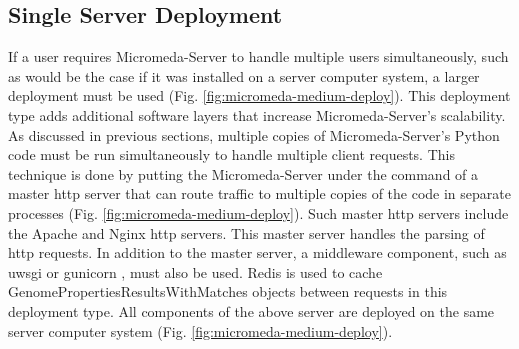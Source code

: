 \subsection{Single Server Deployment} \label{single-server-micromeda-deployment}

If a user requires Micromeda-Server to handle multiple users simultaneously, 
such as would be the case if it was installed on a server computer system, a 
larger deployment must be used (Fig. \ref{fig:micromeda-medium-deploy}). This 
deployment type adds additional software layers that increase Micromeda-Server's 
scalability. As discussed in previous sections, multiple copies of 
Micromeda-Server's Python code must be run simultaneously to handle multiple 
client requests. This technique is done by putting the Micromeda-Server under 
the command of a master \gls{http} server that can route traffic to multiple 
copies of the code in separate processes (Fig. 
\ref{fig:micromeda-medium-deploy}). Such master \gls{http} servers include the 
Apache \cite{fielding1997apache} and Nginx \cite{reese2008nginx} \gls{http} 
servers. This master server handles the parsing of \gls{http} requests. In 
addition to the master server, a middleware component, such as \gls{uwsgi} 
\cite{2019uwsgi} or gunicorn \cite{chesneau_2018}, must also be used. Redis is 
used to cache GenomePropertiesResultsWithMatches objects between requests in 
this deployment type. All components of the above server are deployed on the 
same server computer system (Fig. \ref{fig:micromeda-medium-deploy}).

